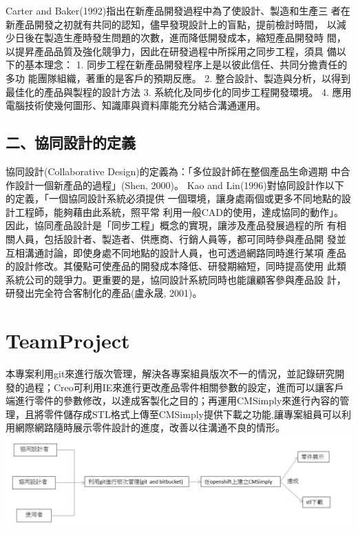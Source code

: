 \documentclass[]{article}
\begin{document}
Carter and Baker(1992)指出在新產品開發過程中為了使設計、製造和生產三
者在新產品開發之初就有共同的認知，儘早發現設計上的盲點，提前檢討時間，
以減少日後在製造生產時發生問題的次數，進而降低開發成本，縮短產品開發時
間，以提昇產品品質及強化競爭力，因此在研發過程中所採用之同步工程，須具
備以下的基本理念： 1.
同步工程在新產品開發程序上是以彼此信任、共同分擔責任的多功
能團隊組織，著重的是客戶的預期反應。 2.
整合設計、製造與分析，以得到最佳化的產品與製程的設計方法 3.
系統化及同步化的同步工程開發環境。 4.
應用電腦技術使幾何圖形、知識庫與資料庫能充分結合溝通運用。

\subsection{二、協同設計的定義}\label{ux4e8cux5354ux540cux8a2dux8a08ux7684ux5b9aux7fa9}

協同設計(Collaborative Design)的定義為：「多位設計師在整個產品生命週期
中合作設計一個新產品的過程」(Shen, 2000)。 Kao and
Lin(1996)對協同設計作以下的定義，「一個協同設計系統必須提供
一個環境，讓身處兩個或更多不同地點的設計工程師，能夠藉由此系統，照平常
利用一般CAD的使用，達成協同的動作」。
因此，協同產品設計是「同步工程」概念的實現，讓涉及產品發展過程的所
有相關人員，包括設計者、製造者、供應商、行銷人員等，都可同時參與產品開
發並互相溝通討論，即使身處不同地點的設計人員，也可透過網路同時進行某項
產品的設計修改。其優點可使產品的開發成本降低、研發期縮短，同時提高使用
此類系統公司的競爭力。更重要的是，協同設計系統同時也能讓顧客參與產品設
計，研發出完全符合客制化的產品(盧永晟, 2001)。

\section{TeamProject}\label{teamproject}

本專案利用git來進行版次管理，解決各專案組員版次不一的情況，並記錄研究開發的過程；Creo可利用IE來進行更改產品零件相關參數的設定，進而可以讓客戶端進行零件的參數修改，以達成客製化之目的；再運用CMSimply來進行內容的管理，且將零件儲存成STL格式上傳至CMSimply提供下載之功能,讓專案組員可以利用網際網路隨時展示零件設計的進度，改善以往溝通不良的情形。
\includegraphics{./../images/2ag7/cdag7_01_process.jpg}
\end{document}
